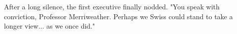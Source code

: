 After a long silence, the first executive finally nodded. "You speak with conviction, Professor Merriweather. Perhaps we Swiss could stand to take a longer view... as we once did."












